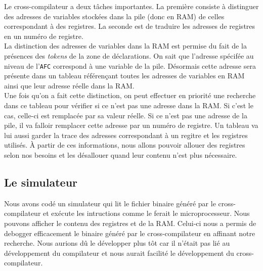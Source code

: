 Le cross-compilateur a deux tâches importantes. La première consiste à distinguer des adresses de variables stockées dans la pile (donc en RAM) de celles correspondant à des registres. La seconde est de traduire les adresses de registres en un numéro de registre.\\
La distinction des adresses de variables dans la RAM est permise du fait de la présences des \textit{tokens} de la zone de déclarations. On sait que l'adresse spécifée au niveau de l'\texttt{AFC} correspond à une variable de la pile. Désormais cette adresse sera présente dans un tableau référençant toutes les adresses de variables en RAM ainsi que leur adresse réelle dans la RAM.\\
Une fois qu'on a fait cette distinction, on peut effectuer en priorité une recherche dans ce tableau pour vérifier si ce n'est pas une adresse dans la RAM. Si c'est le cas, celle-ci est remplacée par sa valeur réelle. Si ce n'est pas une adresse de la pile, il va falloir remplacer cette adresse par un numéro de registre. Un tableau va lui aussi garder la trace des adresses correspondant à un regitre et les registres utilisés. À partir de ces informations, nous allons pouvoir allouer des registres selon nos besoins et les désallouer quand leur contenu n'est plus nécessaire.

\subsection{Le simulateur}

Nous avons codé un simulateur qui lit le fichier binaire généré par le cross-compilateur et exécute les intructions comme le ferait le microprocesseur. Nous pouvons afficher le contenu des registres et de la RAM. Celui-ci nous a permis de debogger efficacement le binaire généré par le cross-compilateur en affinant notre recherche. Nous aurions dû le développer plus tôt car il n'était pas lié au développement du compilateur et nous aurait facilité le développement du cross-compilateur.